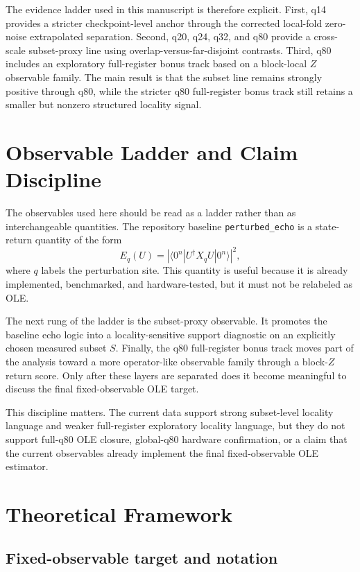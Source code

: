 \documentclass[11pt]{article}
\begin{document}
The evidence ladder used in this manuscript is therefore explicit.
First, q14 provides a stricter checkpoint-level anchor through the corrected local-fold zero-noise extrapolated separation.
Second, q20, q24, q32, and q80 provide a cross-scale subset-proxy line using overlap-versus-far-disjoint contrasts.
Third, q80 includes an exploratory full-register bonus track based on a block-local $Z$ observable family.
The main result is that the subset line remains strongly positive through q80, while the stricter q80 full-register bonus track still retains a smaller but nonzero structured locality signal.

\section{Observable Ladder and Claim Discipline}

The observables used here should be read as a ladder rather than as interchangeable quantities.
The repository baseline \texttt{perturbed\_echo} is a state-return quantity of the form
\begin{equation}
E_q(U)=\left|\langle 0^n|U^\dagger X_q U|0^n\rangle\right|^2,
\end{equation}
where $q$ labels the perturbation site.
This quantity is useful because it is already implemented, benchmarked, and hardware-tested, but it must not be relabeled as OLE.

The next rung of the ladder is the subset-proxy observable.
It promotes the baseline echo logic into a locality-sensitive support diagnostic on an explicitly chosen measured subset $S$.
Finally, the q80 full-register bonus track moves part of the analysis toward a more operator-like observable family through a block-$Z$ return score.
Only after these layers are separated does it become meaningful to discuss the final fixed-observable OLE target.

This discipline matters.
The current data support strong subset-level locality language and weaker full-register exploratory locality language, but they do not support full-q80 OLE closure, global-q80 hardware confirmation, or a claim that the current observables already implement the final fixed-observable OLE estimator.

\section{Theoretical Framework}

\subsection{Fixed-observable target and notation}
\end{document}
